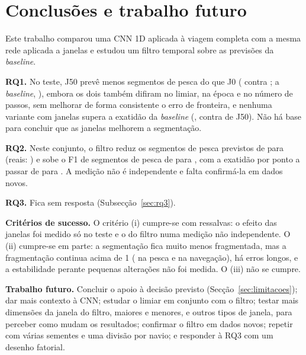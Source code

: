 \documentclass{article}
\begin{document}
\section{Conclusões e trabalho futuro}
\label{sec:conclusoes}
Este trabalho comparou uma CNN 1D aplicada à viagem completa com a mesma rede aplicada a janelas e estudou um filtro temporal sobre as previsões da \emph{baseline}.

\textbf{RQ1.} No teste, J50 prevê menos segmentos de pesca do que J0 (\resJCSegPescaNPred{} contra \resJZSegPescaNPred{}; a \emph{baseline}, \resBsSegPescaNPred{}), embora os dois também difiram no limiar, na época e no número de passos, sem melhorar de forma consistente o erro de fronteira, e nenhuma variante com janelas supera a exatidão da \emph{baseline} (\resBsTesteAcc{}, contra \resJCTesteAcc{} de J50). Não há base para concluir que as janelas melhorem a segmentação.

\textbf{RQ2.} Neste conjunto, o filtro reduz os segmentos de pesca previstos de \resPpASegPescaNPred{} para \resPpDSegPescaNPred{} (reais: \resPpASegPescaNRef{}) e sobe o F1 de segmentos de pesca de \resPpASegPescaF{} para \resPpDSegPescaF{}, com a exatidão por ponto a passar de \resPpAntesAcc{} para \resPpDepoisAcc{}. A medição não é independente e falta confirmá-la em dados novos.

\textbf{RQ3.} Fica sem resposta (Subsecção~\ref{sec:rq3}).

\textbf{Critérios de sucesso.} O critério (i) cumpre-se com ressalvas: o efeito das janelas foi medido só no teste e o do filtro numa medição não independente. O (ii) cumpre-se em parte: a segmentação fica muito menos fragmentada, mas a fragmentação continua acima de 1 (\resPpDSegPescaFrag{} na pesca e \resPpDSegNavFrag{} na navegação), há erros longos, e a estabilidade perante pequenas alterações não foi medida. O (iii) não se cumpre.

\textbf{Trabalho futuro.} Concluir o apoio à decisão previsto (Secção~\ref{sec:limitacoes}); dar mais contexto à CNN; estudar o limiar em conjunto com o filtro; testar mais dimensões da janela do filtro, maiores e menores, e outros tipos de janela, para perceber como mudam os resultados; confirmar o filtro em dados novos; repetir com várias sementes e uma divisão por navio; e responder à RQ3 com um desenho fatorial.

\FloatBarrier


\end{document}

